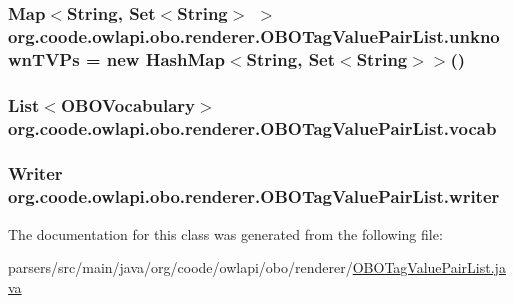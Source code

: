 \hypertarget{classorg_1_1coode_1_1owlapi_1_1obo_1_1renderer_1_1_o_b_o_tag_value_pair_list_a8a0693c46b7ddd42a9c2c320195e9df4}{
\subsubsection[{unknown\-T\-V\-Ps}]{\setlength{\rightskip}{0pt plus 5cm}Map$<$String, Set$<$String$>$ $>$ org.\-coode.\-owlapi.\-obo.\-renderer.\-O\-B\-O\-Tag\-Value\-Pair\-List.\-unknown\-T\-V\-Ps = new Hash\-Map$<$String, Set$<$String$>$$>$()\hspace{0.3cm}{\ttfamily [private]}}}\label{classorg_1_1coode_1_1owlapi_1_1obo_1_1renderer_1_1_o_b_o_tag_value_pair_list_a8a0693c46b7ddd42a9c2c320195e9df4}
\hypertarget{classorg_1_1coode_1_1owlapi_1_1obo_1_1renderer_1_1_o_b_o_tag_value_pair_list_a3392ddecca64f919cde36c0a9d385fc3}{
\subsubsection[{vocab}]{\setlength{\rightskip}{0pt plus 5cm}List$<${\bf O\-B\-O\-Vocabulary}$>$ org.\-coode.\-owlapi.\-obo.\-renderer.\-O\-B\-O\-Tag\-Value\-Pair\-List.\-vocab\hspace{0.3cm}{\ttfamily [private]}}}\label{classorg_1_1coode_1_1owlapi_1_1obo_1_1renderer_1_1_o_b_o_tag_value_pair_list_a3392ddecca64f919cde36c0a9d385fc3}
\hypertarget{classorg_1_1coode_1_1owlapi_1_1obo_1_1renderer_1_1_o_b_o_tag_value_pair_list_ad0a3b1f6b26443723d93319b93c5a904}{
\subsubsection[{writer}]{\setlength{\rightskip}{0pt plus 5cm}Writer org.\-coode.\-owlapi.\-obo.\-renderer.\-O\-B\-O\-Tag\-Value\-Pair\-List.\-writer\hspace{0.3cm}{\ttfamily [private]}}}\label{classorg_1_1coode_1_1owlapi_1_1obo_1_1renderer_1_1_o_b_o_tag_value_pair_list_ad0a3b1f6b26443723d93319b93c5a904}


The documentation for this class was generated from the following file\-:\begin{DoxyCompactItemize}
\item 
parsers/src/main/java/org/coode/owlapi/obo/renderer/\hyperlink{_o_b_o_tag_value_pair_list_8java}{O\-B\-O\-Tag\-Value\-Pair\-List.\-java}\end{DoxyCompactItemize}
